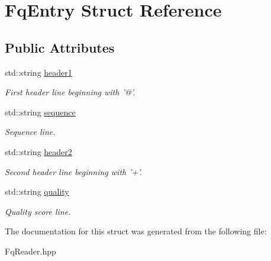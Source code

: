 \hypertarget{structFqEntry}{\section{Fq\-Entry Struct Reference}
\label{structFqEntry}
}
\subsection*{Public Attributes}
\begin{DoxyCompactItemize}
\item 
\hypertarget{structFqEntry_ae17a07da231bceea678310be0d9b34d6}{std\-::string \hyperlink{structFqEntry_ae17a07da231bceea678310be0d9b34d6}{header1}}\label{structFqEntry_ae17a07da231bceea678310be0d9b34d6}

\begin{DoxyCompactList}\small\item\em First header line beginning with '@'. \end{DoxyCompactList}\item 
\hypertarget{structFqEntry_ad393d9df3b923ba48d956cd4277cac21}{std\-::string \hyperlink{structFqEntry_ad393d9df3b923ba48d956cd4277cac21}{sequence}}\label{structFqEntry_ad393d9df3b923ba48d956cd4277cac21}

\begin{DoxyCompactList}\small\item\em Sequence line. \end{DoxyCompactList}\item 
\hypertarget{structFqEntry_aaed1e5d6cad96814cb9e61e2a3ddb3bb}{std\-::string \hyperlink{structFqEntry_aaed1e5d6cad96814cb9e61e2a3ddb3bb}{header2}}\label{structFqEntry_aaed1e5d6cad96814cb9e61e2a3ddb3bb}

\begin{DoxyCompactList}\small\item\em Second header line beginning with '+'. \end{DoxyCompactList}\item 
\hypertarget{structFqEntry_a6891e66e4694218534bc3145728b8130}{std\-::string \hyperlink{structFqEntry_a6891e66e4694218534bc3145728b8130}{quality}}\label{structFqEntry_a6891e66e4694218534bc3145728b8130}

\begin{DoxyCompactList}\small\item\em Quality score line. \end{DoxyCompactList}\end{DoxyCompactItemize}


The documentation for this struct was generated from the following file\-:\begin{DoxyCompactItemize}
\item 
Fq\-Reader.\-hpp\end{DoxyCompactItemize}

